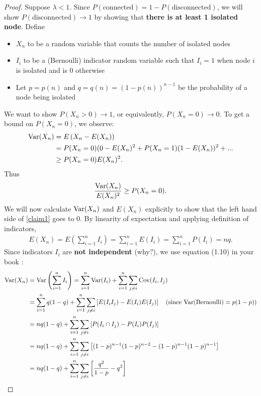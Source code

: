 \documentclass[./some_latex_template.tex]{subfiles}
\begin{document}
\begin{proof}
Suppose $\lambda < 1$. Since $P(\text{connected}) = 1 - P(\text{disconnected})$, we will show $P(\text{disconnected}) \rightarrow 1$ by showing that \textbf{there is at least 1 isolated node}. Define
\begin{itemize}
	\item $X_n$ to be a random variable that counts the number of isolated nodes
	\item $I_i$ to be a (Bernoulli) indicator random variable such that $I_i = 1$ when node $i$ is isolated and is $0$ otherwise
	\item Let $p = p(n)$ and $q = q(n) = (1 - p(n))^{n - 1}$ be  the probability of a node being isolated
\end{itemize}
We want to show $P(X_n > 0) \rightarrow 1$, or equivalently, $P(X_n = 0) \rightarrow 0$. To get a bound on $P(X_n = 0)$, we observe:
\begin{align*}
	\mathop{\rm Var}\nolimits(X_n) 
	&= E\left(X_n - E(X_n)\right)\\
	&= P(X_n = 0)(0 - E(X_n)^2 + P(X_n = 1)(1 - E(X_n))^2 + ...\\
	&\ge P(X_n = 0)E(X_n)^2.
\end{align*}
Thus 
\begin{align}\label{claim1}
\frac{\mathop{\rm Var}\nolimits(X_n)}{E(X_n)^2} \ge P(X_n=0). 
\end{align}
We will now calculate $\mathop{\rm Var}\nolimits(X_n)$ and $E(X_n)$ explicitly to show that the left hand side of \eqref{claim1} goes to 0. By linearity of expectation and applying definition of indicators,
\begin{align*}
	E(X_n) = E\left(\sum_{i=1}^n I_i\right) = \sum_{i=1}^nE(I_i) = \sum_{i=1}^nP(I_i) = nq.
\end{align*}
Since indicators $I_i$ are \textbf{not independent} (why?), we use equation (1.10) in your book \cite{lange2010applied}:
\begin{align*}
	\Var(X_n) 
	&= \Var\left(\sum_{i=1}^nI_i\right) = \sum_{i=1}^n\Var(I_i) + \sum_{i=1}^n\sum_{j\neq i} \Cov(I_i, I_j)\\
	&= \sum_{i=1}^n q(1-q) + \sum_{i=1}^n \sum_{j\neq i}\left[ E(I_iI_j) - E(I_i)E(I_j) \right] \quad (\text{since Var(Bernoulli)} = p(1-p))\\
	&= nq(1-q) + \sum_{i=1}^n \sum_{j\neq i}\left[ P(I_i \cap I_j) - P(I_i)P(I_j) \right]\\
	&= nq(1-q) + \sum_{i=1}^n\sum_{j\neq i}\left[ (1-p)^{n-1}(1-p)^{n-2} - (1-p)^{n-1}(1-p)^{n-1} \right]\\
	&= nq(1-q) + \sum_{i=1}^n\sum_{j\neq i}\left[ \frac{q^2}{1-p} - q^2 \right]\\

\end{align*}
\end{proof}
\end{document}
